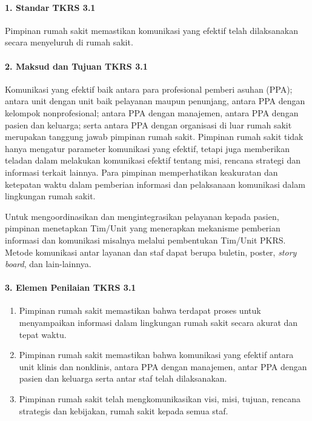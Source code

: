 \documentclass[
]{book}
\providecommand{\tightlist}{%
  \setlength{\itemsep}{0pt}\setlength{\parskip}{0pt}}
\begin{document}
\hypertarget{standar-tkrs-3.1}{%
\paragraph*{1. Standar TKRS 3.1}\label{standar-tkrs-3.1}}

Pimpinan rumah sakit memastikan komunikasi yang efektif telah dilaksanakan secara menyeluruh di rumah sakit.

\hypertarget{maksud-dan-tujuan-tkrs-3.1}{%
\paragraph*{2. Maksud dan Tujuan TKRS 3.1}\label{maksud-dan-tujuan-tkrs-3.1}}

Komunikasi yang efektif baik antara para profesional pemberi asuhan (PPA); antara unit dengan unit baik pelayanan maupun penunjang, antara PPA dengan kelompok nonprofesional; antara PPA dengan manajemen, antara PPA dengan pasien dan keluarga; serta antara PPA dengan organisasi di luar rumah sakit merupakan tanggung jawab pimpinan rumah sakit. Pimpinan rumah sakit tidak hanya mengatur parameter komunikasi yang efektif, tetapi juga memberikan teladan dalam melakukan komunikasi efektif tentang misi, rencana strategi dan informasi terkait lainnya. Para pimpinan memperhatikan keakuratan dan ketepatan waktu dalam pemberian informasi dan pelaksanaan komunikasi dalam lingkungan rumah sakit.

Untuk mengoordinasikan dan mengintegrasikan pelayanan kepada pasien, pimpinan menetapkan Tim/Unit yang menerapkan mekanisme pemberian informasi dan komunikasi misalnya melalui pembentukan Tim/Unit PKRS. Metode komunikasi antar layanan dan staf dapat berupa buletin, poster, \emph{story board}, dan lain-lainnya.

\hypertarget{elemen-penilaian-tkrs-3.1}{%
\paragraph*{3. Elemen Penilaian TKRS 3.1}\label{elemen-penilaian-tkrs-3.1}}

\begin{enumerate}
\def\labelenumi{\alph{enumi}.}
\tightlist
\item
  Pimpinan rumah sakit memastikan bahwa terdapat proses untuk menyampaikan informasi dalam lingkungan rumah sakit secara akurat dan tepat waktu.
\item
  Pimpinan rumah sakit memastikan bahwa komunikasi yang efektif antara unit klinis dan nonklinis, antara PPA dengan manajemen, antar PPA dengan pasien dan keluarga serta antar staf telah dilaksanakan.
\item
  Pimpinan rumah sakit telah mengkomunikasikan visi, misi, tujuan, rencana strategis dan kebijakan, rumah sakit kepada semua staf.
\end{enumerate}
\end{document}
